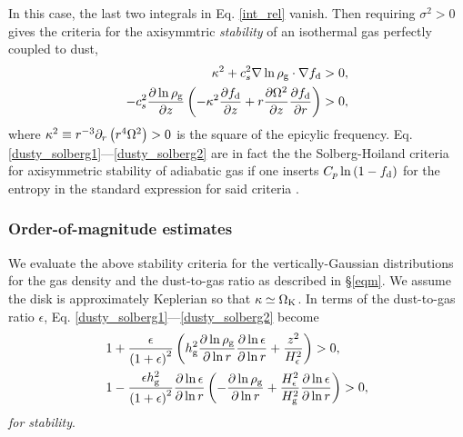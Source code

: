 In this case, the last two integrals in Eq. \ref{int_rel} vanish. Then 
requiring $\sigma^2>0$  gives the criteria 
for the axisymmtric \emph{stability} of an isothermal gas perfectly 
coupled to dust,  
\begin{align}
  \kappa^2 + c_s^2 \nabla\ln{\rho_\mathrm{g}}\cdot\nabla f_\mathrm{d} &> 0,\label{dusty_solberg1}  \\
  -c_s^2\frac{\partial\ln{\rho_\mathrm{g}}}{\partial z}\left(-\kappa^2\frac{\partial f_\mathrm{d}}{\partial
    z} + r\frac{\partial\Omega^2}{\partial z}\frac{\partial f_\mathrm{d}}{\partial r} \right) & > 0, \label{dusty_solberg2}
\end{align} 
where %
$\kappa^2 \equiv r^{-3}\partial_r\left(r^4\Omega^2\right)>0$ is the 
square of the epicylic frequency. %
Eq. \ref{dusty_solberg1}---\ref{dusty_solberg2} are in fact the 
the Solberg-Hoiland criteria for axisymmetric stability of adiabatic
gas if one inserts $C_p\ln{\left(1 -
    f_\mathrm{d}\right)}$ for the entropy in the standard
expression for said criteria \citep[e.g.]{tassoul78}.   


\subsubsection{Order-of-magnitude estimates} 
We evaluate the above stability criteria for the vertically-Gaussian
distributions for the gas density and the dust-to-gas ratio as 
described in \S\ref{eqm}. 
We assume the disk is approximately Keplerian so that
$\kappa\simeq\Omega_{\rm K}$. In terms of the dust-to-gas
ratio $\epsilon$, Eq. \ref{dusty_solberg1}---\ref{dusty_solberg2}
become   
\begin{align}
  &1 + \frac{\epsilon}{\left(1+
    \epsilon\right)^2}\left(h_\mathrm{g}^2\frac{\partial\ln{\rho_\mathrm{g}}}{\partial\ln{r}}
  \frac{\partial\ln{\epsilon}}{\partial\ln{r}} + 
  \frac{z^2}{H_\epsilon^2}\right)>0 \label{stability_est1},   \\ 
&1 - \frac{\epsilon
  h_\mathrm{g}^2}{\left(1+\epsilon\right)^2}
  \frac{\partial\ln{\epsilon}}{\partial\ln{r}}\left(-\frac{\partial\ln{\rho_\mathrm{g}}}{\partial\ln{r}}+\frac{H_\epsilon^2}{H_\mathrm{g}^2}\frac{\partial\ln{\epsilon}}{\partial\ln{r}}\right)
  > 0 \label{stability_est2},
\end{align}
\emph{for stability}. 

